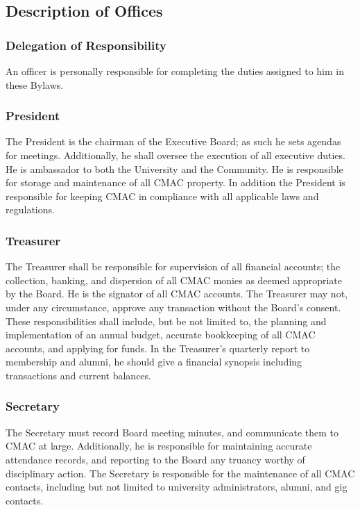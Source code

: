 \documentclass{article}
\begin{document}
\subsection{Description of Offices}

\subsubsection{Delegation of Responsibility}

An officer is personally responsible for completing the duties assigned
to him in these Bylaws.

\subsubsection{President}

The President is the chairman of the Executive Board; as such he sets
agendas for meetings. Additionally, he shall oversee the execution
of all executive duties. He is ambassador to both the University and
the Community. He is responsible for storage and maintenance of all
CMAC property. In addition the President is responsible for keeping
CMAC in compliance with all applicable laws and regulations.

\subsubsection{Treasurer}

The Treasurer shall be responsible for supervision of all financial
accounts; the collection, banking, and dispersion of all CMAC monies
as deemed appropriate by the Board. He is the signator of all CMAC
accounts. The Treasurer may not, under any circumstance, approve any
transaction without the Board's consent. These responsibilities shall
include, but be not limited to, the planning and implementation of
an annual budget, accurate bookkeeping of all CMAC accounts, and applying
for funds. In the Treasurer's quarterly report to membership and alumni,
he should give a financial synopsis including transactions and current
balances.

\subsubsection{Secretary}

The Secretary must record Board meeting minutes, and communicate them
to CMAC at large. Additionally, he is responsible for maintaining
accurate attendance records, and reporting to the Board any truancy
worthy of disciplinary action. The Secretary is responsible for the
maintenance of all CMAC contacts, including but not limited to university
administrators, alumni, and gig contacts.
\end{document}
